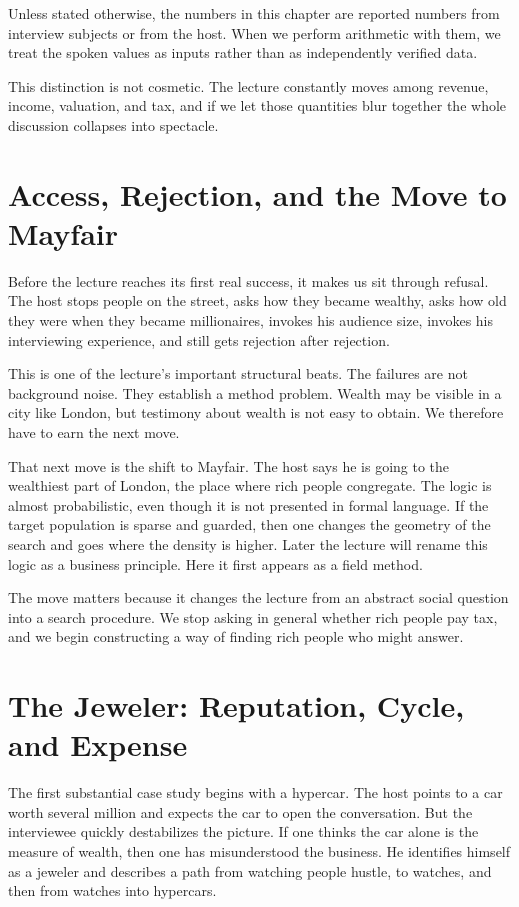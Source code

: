 \begin{remark}
Unless stated otherwise, the numbers in this chapter are reported numbers from interview subjects or from the host. When we perform arithmetic with them, we treat the spoken values as inputs rather than as independently verified data.
\end{remark}

This distinction is not cosmetic. The lecture constantly moves among revenue, income, valuation, and tax, and if we let those quantities blur together the whole discussion collapses into spectacle.

\section{Access, Rejection, and the Move to Mayfair}

Before the lecture reaches its first real success, it makes us sit through refusal. The host stops people on the street, asks how they became wealthy, asks how old they were when they became millionaires, invokes his audience size, invokes his interviewing experience, and still gets rejection after rejection.

This is one of the lecture's important structural beats. The failures are not background noise. They establish a method problem. Wealth may be visible in a city like London, but testimony about wealth is not easy to obtain. We therefore have to earn the next move.

That next move is the shift to Mayfair. The host says he is going to the wealthiest part of London, the place where rich people congregate. The logic is almost probabilistic, even though it is not presented in formal language. If the target population is sparse and guarded, then one changes the geometry of the search and goes where the density is higher. Later the lecture will rename this logic as a business principle. Here it first appears as a field method.

The move matters because it changes the lecture from an abstract social question into a search procedure. We stop asking in general whether rich people pay tax, and we begin constructing a way of finding rich people who might answer.

\section{The Jeweler: Reputation, Cycle, and Expense}

The first substantial case study begins with a hypercar. The host points to a car worth several million and expects the car to open the conversation. But the interviewee quickly destabilizes the picture. If one thinks the car alone is the measure of wealth, then one has misunderstood the business. He identifies himself as a jeweler and describes a path from watching people hustle, to watches, and then from watches into hypercars.

